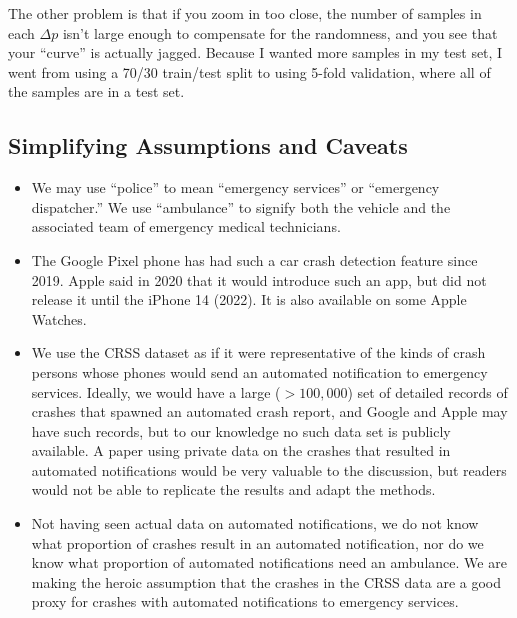 The other problem is that if you zoom in too close, the number of samples in each $\Delta p$ isn't large enough to compensate for the randomness, and you see that your ``curve'' is actually jagged.  Because I wanted more samples in my test set, I went from using a 70/30 train/test split to using 5-fold validation, where all of the samples are in a test set.  
	

\subsection{Simplifying Assumptions and Caveats}

\begin{itemize}
	\item We may use ``police'' to mean ``emergency services'' or ``emergency dispatcher.''  We use ``ambulance'' to signify both the vehicle and the associated team of emergency medical technicians.  
	\item The Google Pixel phone has had such a car crash detection feature since 2019.  Apple said in 2020 that it would introduce such an app, but did not release it until the iPhone 14 (2022).  It is also available on some Apple Watches.  
	\item We use the CRSS dataset as if it were representative of the kinds of crash persons whose phones would send an automated notification to emergency services.  Ideally, we would have a large ($>100,000$) set of detailed records of crashes that spawned an automated crash report, and Google and Apple may have such records, but to our knowledge no such data set is publicly available.  A paper using private data on the crashes that resulted in automated notifications would be very valuable to the discussion, but readers would not be able to replicate the results and adapt the methods.
	\item Not having seen actual data on automated notifications, we do not know what proportion of crashes result in an automated notification, nor do we know what proportion of automated notifications need an ambulance.  We are making the heroic assumption that the crashes in the CRSS data are a good proxy for crashes with automated notifications to emergency services.  
\end{itemize}






